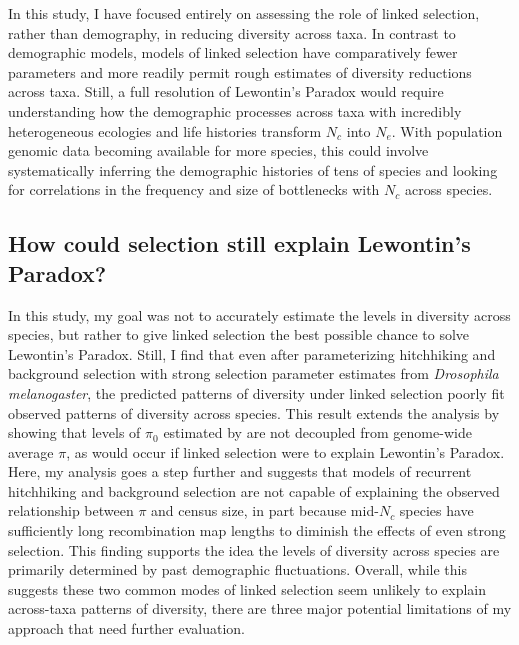 \documentclass[11pt]{article}
\begin{document}
In this study, I have focused entirely on assessing the role of linked
selection, rather than demography, in reducing diversity across taxa. In
contrast to demographic models, models of linked selection have comparatively
fewer parameters and more readily permit rough estimates of diversity
reductions across taxa. Still, a full resolution of Lewontin's Paradox would
require understanding how the demographic processes across taxa with incredibly
heterogeneous ecologies and life histories transform $N_c$ into $N_e$. With
population genomic data becoming available for more species, this could involve
systematically inferring the demographic histories of tens of species and
looking for correlations in the frequency and size of bottlenecks with $N_c$
across species.

\subsection*{How could selection still explain Lewontin's Paradox?}

In this study, my goal was not to accurately estimate the levels in diversity
across species, but rather to give linked selection the best possible chance to
solve Lewontin's Paradox. Still, I find that even after parameterizing
hitchhiking and background selection with strong selection parameter estimates
from \emph{Drosophila melanogaster}, the predicted patterns of diversity under
linked selection poorly fit observed patterns of diversity across species.
This result extends the analysis by \textcite{Coop2016-gx} showing that levels
of $\pi_0$ estimated by \textcite{Corbett-Detig2015-gt} are not decoupled from
genome-wide average $\pi$, as would occur if linked selection were to explain
Lewontin's Paradox. Here, my analysis goes a step further and suggests that
models of recurrent hitchhiking and background selection are not capable of
explaining the observed relationship between $\pi$ and census size, in part
because mid-$N_c$ species have sufficiently long recombination map lengths to
diminish the effects of even strong selection. This finding supports the idea
the levels of diversity across species are primarily determined by past
demographic fluctuations. Overall, while this suggests these two common modes
of linked selection seem unlikely to explain across-taxa patterns of diversity,
there are three major potential limitations of my approach that need further
evaluation. 
\end{document}
